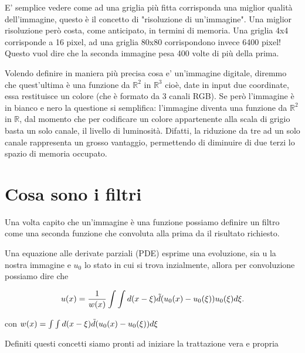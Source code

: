 E' semplice vedere come ad una griglia più fitta corrisponda una miglior qualità dell'immagine, questo è il concetto di "risoluzione di un'immagine". 
Una miglior risoluzione però costa, come anticipato, in termini di memoria. Una griglia 4x4 corrisponde a 16 pixel, ad una griglia 80x80 corrispondono invece 6400 pixel! Questo vuol dire che la seconda immagine pesa 400 volte di più della prima.


Volendo definire in maniera più precisa cosa e' un'immagine digitale, diremmo che quest'ultima è una funzione da $\mathbb R^2$ in $\mathbb R^3$ cioè, date in input due coordinate, essa restituisce un colore (che è formato da 3 canali RGB). Se però l'immagine è in bianco e nero la questione si semplifica: l'immagine diventa una funzione da $\mathbb R^2$ in $\mathbb R$, dal momento che per codificare un colore appartenente alla scala di grigio basta un solo canale, il livello di luminosità. Difatti, la riduzione da tre ad un solo canale rappresenta un grosso vantaggio, permettendo di diminuire di due terzi lo spazio di memoria occupato.

\section{Cosa sono i filtri}
Una volta capito che un'immagine è una funzione possiamo definire un filtro come una seconda funzione che convoluta alla prima da il risultato richiesto.


Una equazione alle derivate parziali (PDE) esprime una evoluzione, sia u la nostra immagine e $u_0$ lo stato in cui si trova inzialmente, allora per convoluzione possiamo dire che 

\begin{equation} \label{eq:eq3}
u(x)=\frac{1}{w(x)}\int\int d(x-\xi)\Tilde{d}(u_0(x) -u_0(\xi))u_0(\xi)d\xi.
\end{equation}

\centering con  $w(x) = \int\int d(x-\xi)\Tilde{d}(u_0(x) -u_0(\xi))d\xi$\newline

\raggedright

Definiti questi concetti siamo pronti ad iniziare la trattazione vera e propria


